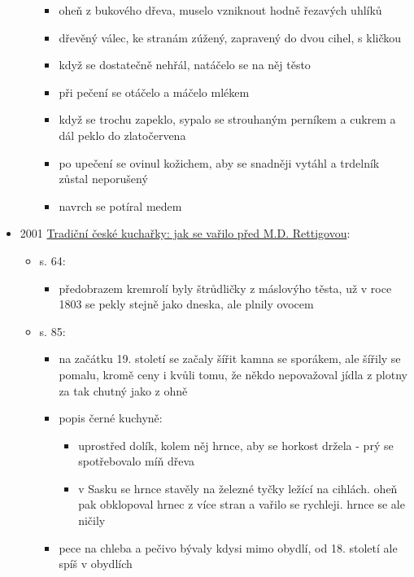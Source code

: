 \begin{itemize}
\begin{itemize}
    \begin{itemize}
    \tightlist
    \item
      oheň z bukového dřeva, muselo vzniknout hodně řezavých uhlíků
    \item
      dřevěný válec, ke stranám zúžený, zapravený do dvou cihel, s
      kličkou
    \item
      když se dostatečně nehřál, natáčelo se na něj těsto
    \item
      při pečení se otáčelo a máčelo mlékem
    \item
      když se trochu zapeklo, sypalo se strouhaným perníkem a cukrem a
      dál peklo do zlatočervena
    \item
      po upečení se ovinul kožichem, aby se snadněji vytáhl a trdelník
      zůstal neporušený
    \item
      navrch se potíral medem
    \end{itemize}
  \end{itemize}
\item
  2001
  \href{https://www.digitalniknihovna.cz/mzk/uuid/uuid:cb2e49c0-cab1-11e7-bfaa-005056827e52}{Tradiční
  české kuchařky: jak se vařilo před M.D. Rettigovou}:

  \begin{itemize}
  \tightlist
  \item
    s. 64:

    \begin{itemize}
    \tightlist
    \item
      předobrazem kremrolí byly štrůdličky z máslovýho těsta, už v roce
      1803 se pekly stejně jako dneska, ale plnily ovocem
    \end{itemize}
  \item
    s. 85:

    \begin{itemize}
    \tightlist
    \item
      na začátku 19. století se začaly šířit kamna se sporákem, ale
      šířily se pomalu, kromě ceny i kvůli tomu, že někdo nepovažoval
      jídla z plotny za tak chutný jako z ohně
    \item
      popis černé kuchyně:

      \begin{itemize}
      \tightlist
      \item
        uprostřed dolík, kolem něj hrnce, aby se horkost držela - prý se
        spotřebovalo míň dřeva
      \item
        v Sasku se hrnce stavěly na železné tyčky ležící na cihlách.
        oheň pak obklopoval hrnec z více stran a vařilo se rychleji.
        hrnce se ale ničily
      \end{itemize}
    \item
      pece na chleba a pečivo bývaly kdysi mimo obydlí, od 18. století
      ale spíš v obydlích


\end{itemize}
\end{itemize}
\end{itemize}
